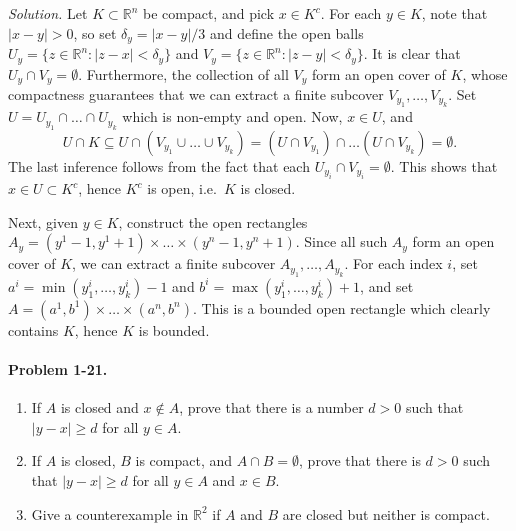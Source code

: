 \documentclass[11pt]{report}
\newcommand{\R}{\mathbb{R}}
\newcommand{\problem}[1]{\paragraph{Problem #1.}}
\newcommand{\solution}{\noindent\textit{Solution.} }
\begin{document}
    \solution Let $K \subset \R^n$ be compact, and pick $x \in K^c$. For each $y \in
    K$, note that $|x - y| > 0$, so set $\delta_y = |x - y| / 3$ and define the open
    balls $U_y = \{z \in \R^n : |z - x| < \delta_y\}$ and $V_y = \{z \in \R^n : |z -
    y| < \delta_y\}$. It is clear that $U_y \cap V_y = \emptyset$. Furthermore, the
    collection of all $V_y$ form an open cover of $K$, whose compactness guarantees
    that we can extract a finite subcover $V_{y_1}, \dots, V_{y_k}$. Set $U = U_{y_1}
    \cap \dots \cap U_{y_k}$ which is non-empty and open. Now, $x \in U$, and \[
        U \cap K \subseteq U \cap (V_{y_1} \cup \dots \cup V_{y_k}) = (U \cap
        V_{y_1}) \cap \dots (U \cap V_{y_k}) = \emptyset.
    \] The last inference follows from the fact that each $U_{y_i} \cap V_{y_i} =
    \emptyset$. This shows that $x \in U \subset K^c$, hence $K^c$ is open, i.e.\ $K$
    is closed.

    Next, given $y \in K$, construct the open rectangles $A_y = (y^1 - 1, y^1 + 1)
    \times \dots \times (y^n - 1, y^n + 1)$. Since all such $A_y$ form an open cover
    of $K$, we can extract a finite subcover $A_{y_1}, \dots, A_{y_k}$. For each
    index $i$, set $a^i = \min(y_1^i, \dots, y_k^i) - 1$ and $b^i = \max(y_1^i,
    \dots, y_k^i) + 1$, and set $A = (a^1, b^1) \times \dots \times (a^n, b^n)$. This
    is a bounded open rectangle which clearly contains $K$, hence $K$ is bounded.


    \problem{1-21} \begin{enumerate}
        \item If $A$ is closed and $x \notin A$, prove that there is a number $d > 0$
        such that $|y - x| \geq d$ for all $y \in A$.

        \item If $A$ is closed, $B$ is compact, and $A \cap B = \emptyset$, prove
        that there is $d > 0$ such that $|y - x| \geq d$ for all $y \in A$ and $x \in
        B$.

        \item Give a counterexample in $\R^2$ if $A$ and $B$ are closed but neither
        is compact.
    \end{enumerate}
\end{document}
